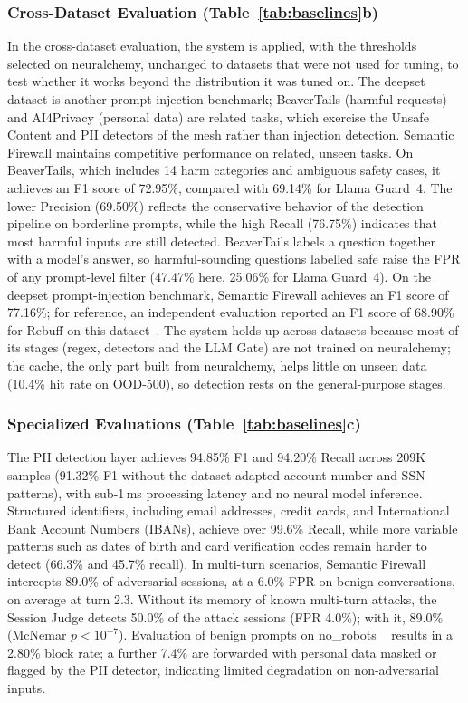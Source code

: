 \documentclass[runningheads]{llncs}
\newif\ifrev
\newcommand{\rev}[1]{\ifrev\hl{#1}\else#1\fi}                  %
\begin{document}
\subsubsection{Cross-Dataset Evaluation (Table~\ref{tab:baselines}b)}
\rev{In the cross-dataset evaluation, the system is applied, with the thresholds selected on neuralchemy, unchanged to datasets that were not used for tuning, to test whether it works beyond the distribution it was tuned on. The deepset dataset is another prompt-injection benchmark; BeaverTails (harmful requests) and AI4Privacy (personal data) are related tasks, which exercise the Unsafe Content and PII detectors of the mesh rather than injection detection.} Semantic Firewall maintains competitive performance \rev{on related, unseen
tasks}. On BeaverTails, which includes 14 harm categories and
ambiguous safety cases, it achieves an F1 score of \rev{72.95\%}, compared
with \rev{69.14\%} for Llama Guard~4. The lower Precision (\rev{69.50\%}) reflects
the conservative behavior of the detection pipeline on borderline
prompts, while the high Recall (\rev{76.75\%}) indicates that most harmful
inputs are still detected. \rev{BeaverTails labels a question together with a model's answer, so harmful-sounding questions labelled safe raise the FPR of any prompt-level filter (47.47\% here, 25.06\% for Llama Guard~4).} On the deepset prompt-injection benchmark,
Semantic Firewall achieves an F1 score of \rev{77.16\%}\rev{; for reference,
an independent evaluation reported an F1 score of 68.90\% for Rebuff on
this dataset~\cite{palit2025}}. \rev{The system holds up across datasets because most of its stages (regex, detectors and the LLM Gate) are not trained on neuralchemy; the cache, the only part built from neuralchemy, helps little on unseen data (10.4\% hit rate on OOD-500), so detection rests on the general-purpose stages.}


\subsubsection{Specialized Evaluations (Table~\ref{tab:baselines}c)}
The PII detection layer achieves \rev{94.85\%} F1 and \rev{94.20\%} Recall across
209K samples \rev{(91.32\% F1 without the dataset-adapted account-number and SSN patterns)}, with \rev{sub-1\,ms} processing latency and no neural model
inference. Structured identifiers, including email addresses, credit
cards, and International Bank Account Numbers (IBANs), achieve over \rev{99.6\%} Recall, while more variable
patterns such as \rev{dates of birth and card verification codes} remain harder to detect (\rev{66.3\% and 45.7\%}
recall). In multi-turn scenarios, Semantic Firewall intercepts \rev{89.0\%}
of adversarial sessions\rev{, at a 6.0\% FPR on benign conversations, on average at turn 2.3. Without its memory of known multi-turn attacks, the Session Judge detects 50.0\% of the attack sessions (FPR 4.0\%); with it, 89.0\% (McNemar $p<10^{-7}$)}. Evaluation of benign prompts on no\_robots ~\cite{norobots} results in a
\rev{2.80\% block rate; a further 7.4\% are forwarded with personal data masked or flagged by the PII detector,} indicating limited degradation on non-adversarial inputs.
\end{document}
